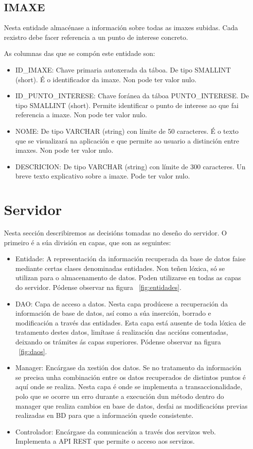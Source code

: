\subsection{IMAXE}
Nesta entidade almacénase a información sobre todas as imaxes subidas. Cada rexistro debe facer referencia a un punto de interese concreto.

As columnas das que se compón este entidade son:
\begin{itemize}
	\item ID\_IMAXE: Chave primaria autoxerada da táboa. De tipo SMALLINT (short). É o identificador da imaxe. Non pode ter valor nulo.
	\item ID\_PUNTO\_INTERESE: Chave foránea da táboa PUNTO\_INTERESE. De tipo SMALLINT (short). Permite identificar o punto de interese ao que fai referencia a imaxe. Non pode ter valor nulo.
	\item NOME: De tipo VARCHAR (string) con límite de 50 caracteres. É o texto que se visualizará na aplicación e que permite ao usuario a distinción entre imaxes. Non pode ter valor nulo.
	\item DESCRICION: De tipo VARCHAR (string) con límite de 300 caracteres. Un breve texto explicativo sobre a imaxe. Pode ter valor nulo.
\end{itemize}


\section{Servidor}
Nesta sección describiremos as decisións tomadas no deseño do servidor. O primeiro é a súa división en capas, que son as seguintes:

\begin{itemize}
	\item Entidade: A representación da información recuperada da base de datos faise mediante certas clases denominadas entidades. Non teñen lóxica, só se utilizan para o almacenamento de datos. Poden utilizarse en todas as capas do servidor. Pódense observar na figura ~\ref{fig:entidades}.
	\item DAO: Capa de acceso a datos. Nesta capa prodúcese a recuperación da información de base de datos, así como a súa inserción, borrado e modificación a través das entidades. Esta capa está ausente de toda lóxica de tratamento destes datos, limítase á realización das accións comentadas, deixando os trámites ás capas superiores. Pódense observar na figura  ~\ref{fig:daos}.
	\item Manager: Encárgase da xestión dos datos. Se no tratamento da información se precisa unha combinación entre os datos recuperados de distintos puntos é aquí onde se realiza. Nesta capa é onde se implementa a transaccionalidade, polo que se ocorre un erro durante a execución dun método dentro do manager que realiza cambios en base de datos, desfai as modificacións previas realizadas en BD para que a información quede consistente.
	\item Controlador: Encárgase da comunicación a través dos servizos web. Implementa a API REST que permite o acceso aos servizos.
\end{itemize}

